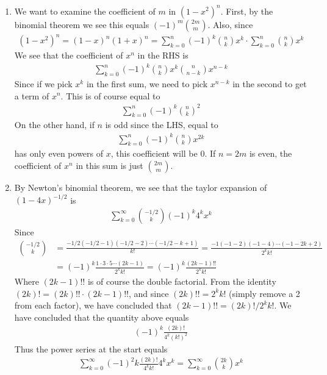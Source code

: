 \documentclass[12pt]{article}
\theoremstyle{definitionstyle}
\begin{document}
\begin{enumerate}
		\newpage
		\item We want to examine the coefficient of $m$ in $(1-x^2)^n$. First, by the binomial theorem we see this equals $(-1)^m {2m \choose m}$. Also, since
		\begin{align*}
			(1-x^2)^n = (1-x)^n(1+x)^n = \sum_{k=0}^n (-1)^k {n \choose k} x^k \cdot \sum_{k=0}^n {n \choose k} x^k
		\end{align*}
		We see that the coefficient of $x^n$ in the RHS is 
		\begin{align*}
			\sum_{k=0}^n (-1)^k {n \choose k} x^k {n \choose n-k} x^{n-k}
		\end{align*}
		Since if we pick $x^k$ in the first sum, we need to pick $x^{n-k}$ in the second to get a term of $x^n$. This is of course equal to
		\begin{align*}
			\sum_{k=0}^{n} (-1)^k {n \choose k}^2
		\end{align*}
		On the other hand, if $n$ is odd since the LHS, equal to 
		\begin{align*}
			\sum_{k=0}^{n} (-1)^k {n \choose k} x^{2k}
		\end{align*}
		has only even powers of $x$, this coefficient will be 0. If $n=2m$ is even, the coefficient of $x^n$ in this sum is just ${2m \choose m}$.
		
		\newpage
		\item By Newton's binomial theorem, we see that the taylor expansion of $(1-4x)^{-1/2}$ is
		\begin{align*}
			\sum_{k=0}^\infty {-1/2 \choose k} (-1)^k 4^k x^k
		\end{align*}
		Since 
		\begin{align*}
			{-1/2 \choose k} &= \frac{-1/2(-1/2-1)(-1/2-2)\cdots(-1/2-k+1)}{k!} = \frac{-1(-1-2)(-1-4) \cdots (-1-2k+2)}{2^k k!} \\
			&= (-1)^k \frac{1 \cdot 3 \cdot 5 \cdots (2k-1)}{2^k k!} = (-1)^k \frac{(2k-1)!!}{2^k k!}
		\end{align*}
		Where $(2k-1)!!$ is of course the double factorial. From the identity $(2k)! = (2k)!! \cdot (2k-1)!!$, and since $(2k)!! = 2^k k!$ (simply remove a 2 from each factor), we have concluded that $(2k-1)!! = (2k)!/2^k k!$. We have concluded that the quantity above equals
		\begin{align*}
			(-1)^k \frac{(2k)!}{4^k (k!)^2}
		\end{align*}
		Thus the power series at the start equals
		\begin{align*}
			\sum_{k=0}^\infty (-1)^2k \frac{(2k)!}{4^k k!} 4^kx^k = \sum_{k=0}^\infty {2k \choose k} x^k
		\end{align*}
	\end{enumerate}
\end{document}
